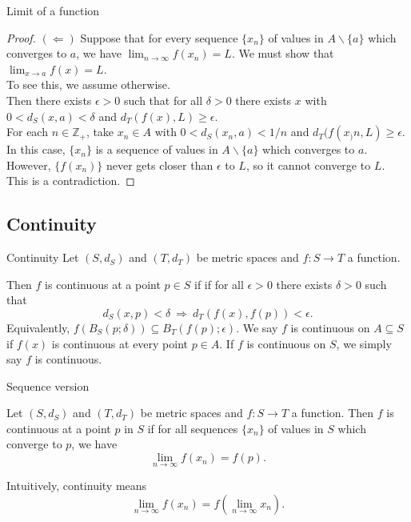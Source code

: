 \documentclass{beamer}
\begin{document}
\begin{frame}{Limit of a function}
\begin{proof}
$(\Leftarrow)$\quad
Suppose that for every sequence $\{x_n\}$ of values in $A\backslash\{a\}$ which converges to $a$, we have $\lim_{n\rightarrow \infty} f(x_n) = L$.
\pause
We must show that $\lim_{x\rightarrow a} f(x) = L$.\\
\pause
To see this, we assume otherwise.\\
\pause
Then there exists $\epsilon > 0$ such that for all $\delta > 0$ there exists $x$ with $0 < d_S(x,a) < \delta$ and $d_T(f(x),L) \geq \epsilon$.\\
\pause
For each $n\in \mathbb{Z}_+$, take $x_n\in A$ with $0 < d_S(x_n,a) < 1/n$ and $d_T(f(x_)n,L) \geq \epsilon$.\\
\pause
In this case, $\{x_n\}$ is a sequence of values in $A\backslash\{a\}$ which converges to $a$.\\
\pause
However, $\{f(x_n)\}$ never gets closer than $\epsilon$ to $L$, so it cannot converge to $L$.\\
\pause
This is a contradiction.
\end{proof}
\end{frame}


\subsection{Continuity}

\begin{frame}{Continuity}
Let $(S,d_S)$ and $(T,d_T)$ be metric spaces and $f: S\rightarrow T$ a function.
\pause
\begin{defn}
\pause
Then $f$ is continuous at a point $p\in S$ if 
if for all $\epsilon > 0$ there exists $\delta > 0$ such that
$$d_S(x,p) < \delta\ \Rightarrow\ d_T(f(x),f(p)) < \epsilon.$$
\pause
Equivalently, $f(B_S(p;\delta))\subseteq B_T(f(p);\epsilon)$.
\pause
We say $f$ is continuous on $A\subseteq S$ if $f(x)$ is continuous at every point $p\in A$.
\pause
If $f$ is continuous on $S$, we simply say $f$ is continuous.
\end{defn}
\end{frame}

\begin{frame}{Sequence version}
\pause
\begin{thm}
Let $(S,d_S)$ and $(T,d_T)$ be metric spaces and $f: S\rightarrow T$ a function.
\pause
Then $f$ is continuous at a point $p$ in $S$ if for all sequences $\{x_n\}$ of values in $S$ which converge to $p$, we have
\pause
$$\lim_{n\rightarrow\infty} f(x_n) = f(p).$$
\end{thm}
\pause
Intuitively, continuity means
$$\lim_{n\rightarrow\infty} f(x_n) = f\left(\lim_{n\rightarrow\infty} x_n\right).$$
\end{frame}
\end{document}
